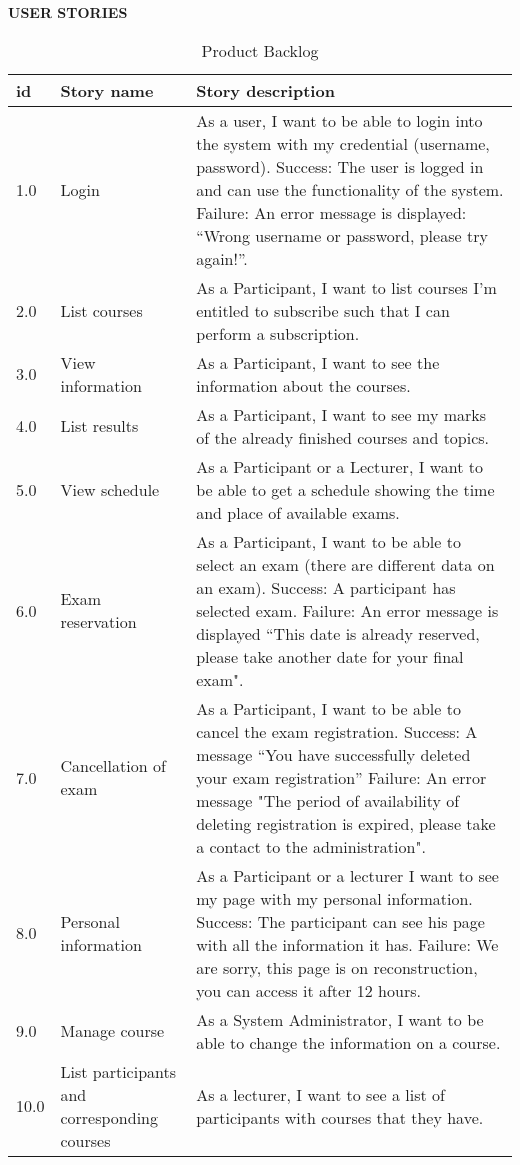 \documentclass{scrartcl}
\begin{document}
  \begin{table}[H]
\begin{center}
\textbf{USER STORIES }\\[1cm]
\begin{tabular}{| p{2.5cm}| p{4cm} | p{9cm} |}
\hline
\textbf{id} & \textbf{Story name} & \textbf{Story description}\\
\hline      
	
	1.0 & Login & As a user, I want to be able to login into the system with my credential (username, password).
 Success: The user is logged in and can use the functionality of the system.
 Failure: An error message is displayed: “Wrong username or password, please try again!”. \\ \hline
	2.0 & List courses & As a Participant, I want to list courses I'm entitled to subscribe such that I can perform a subscription. \\ \hline
	3.0 & View information & As a Participant, I want to see the information about the courses. \\ \hline
	4.0 & List results & As a Participant, I want to see my marks of the already finished courses and topics. \\ \hline
	5.0 & View schedule & As a Participant or a Lecturer, I want to be able to get a schedule showing the time and place of available exams. \\ \hline
	6.0 & Exam reservation & As a Participant, I want to be able to select an exam (there are different data on an exam).
 Success: A participant has selected exam.
 Failure: An error message is displayed “This date is already reserved, please take another date for your final exam". \\ \hline
	7.0 & Cancellation of exam & As a Participant, I want to be able to cancel the exam registration.
 Success: A message “You have successfully deleted your exam registration”
 Failure: An error message "The period of availability of deleting registration is expired, please take a contact to the administration". \\ \hline
	8.0 & Personal information & As a Participant or a lecturer I want to see my page with my personal information.
 Success: The participant can see his page with all the information it has.
 Failure: We are sorry, this page is on reconstruction, you can access it after 12 hours. \\ \hline
	9.0 & Manage course & As a System Administrator, I want to be able to change the information on a course.
 
 \\ \hline
	10.0 & List participants and corresponding courses & As a lecturer, I want to see a list of participants with courses that they have.
 
\\ \hline


        
        \end{tabular}
\end{center}
\caption{Product Backlog}
\label{table2}
\end{table}
\end{document}
